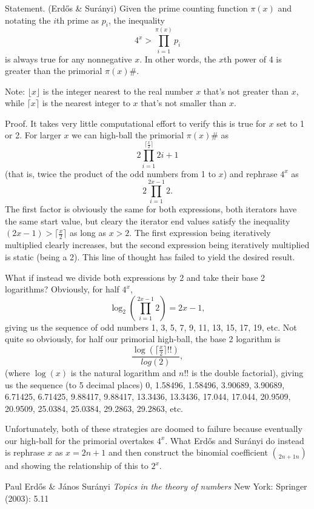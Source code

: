 \documentclass[12pt]{article}
\begin{document}
Statement. (Erd\H{o}s \& Sur\'anyi) Given the prime counting function $\pi(x)$ and notating the $i$th prime as $p_i$, the inequality $$4^x > \prod_{i = 1}^{\pi(x)} p_i$$ is always true for any nonnegative $x$. In other words, the $x$th power of 4 is greater than the primorial $\pi(x)\#$.

Note: $\lfloor x \rfloor$ is the integer nearest to the real number $x$ that's not greater than $x$, while $\lceil x \rceil$ is the nearest integer to $x$ that's not smaller than $x$.

Proof. It takes very little computational effort to verify this is true for $x$ set to 1 or 2. For larger $x$ we can high-ball the primorial $\pi(x)\#$ as $$2 \prod_{i = 1}^{\lceil \frac{x}{2} \rceil} 2i + 1$$ (that is, twice the product of the odd numbers from 1 to $x$) and rephrase $4^x$ as $$2 \prod_{i = 1}^{2x - 1} 2.$$ The first factor is obviously the same for both expressions, both iterators have the same start value, but cleary the iterator end values  satisfy the inequality $(2x - 1) > \lceil \frac{x}{2} \rceil$ as long as $x > 2$. The first expression being iteratively multiplied clearly increases, but the second expression being iteratively multiplied is static (being a 2). This line of thought has failed to yield the desired result.

What if instead we divide both expressions by 2 and take their base 2 logarithms? Obviously, for half $4^x$, $$\log_2\left( \prod_{i = 1}^{2x - 1} 2 \right) = 2x - 1,$$ giving us the sequence of odd numbers 1, 3, 5, 7, 9, 11, 13, 15, 17, 19, etc. Not quite so obviously, for half our primorial high-ball, the base 2 logarithm is $$\frac{\log(\lceil \frac{x}{2} \rceil !!)}{log(2)},$$ (where $\log(x)$ is the natural logarithm and $n!!$ is the double factorial), giving us the sequence (to 5 decimal places) 0, 1.58496, 1.58496, 3.90689, 3.90689, 6.71425, 6.71425, 9.88417, 9.88417, 13.3436, 13.3436, 17.044, 17.044, 20.9509, 20.9509, 25.0384, 25.0384, 29.2863, 29.2863, etc.

Unfortunately, both of these strategies are doomed to failure because eventually our high-ball for the primorial overtakes $4^x$. What Erd\H{o}s and Sur\'anyi do instead is rephrase $x$ as $x = 2n + 1$ and then construct the binomial coefficient $\choose{2n + 1}{n}$ and showing the relationship of this to $2^x$.


\begin{thebibliography}{1}
 Paul Erd\H{o}s \& J\'anos Sur\'anyi {\it Topics in the theory of numbers} New York: Springer (2003): 5.11
\end{thebibliography}
\end{document}
